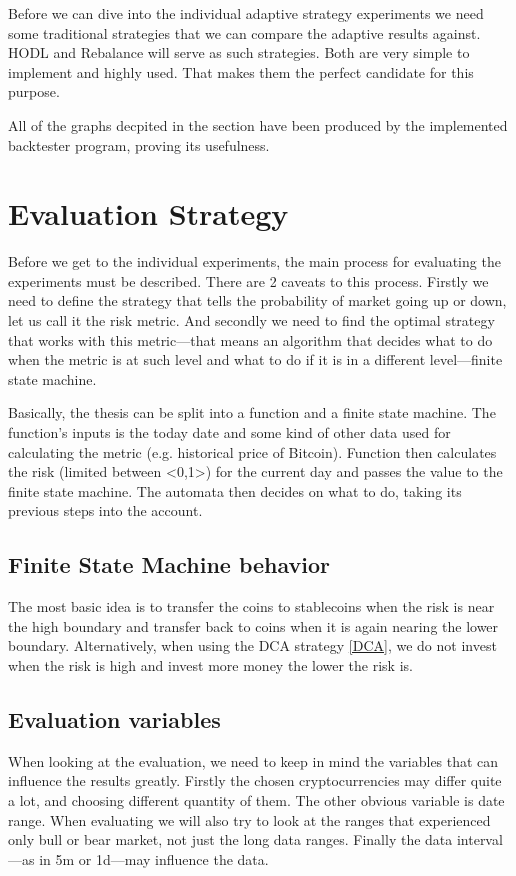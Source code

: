 Before we can dive into the individual adaptive strategy experiments we need some traditional strategies that we can compare the adaptive results against. HODL and Rebalance will serve as such strategies. Both are very simple to implement and highly used. That makes them the perfect candidate for this purpose.

All of the graphs decpited in the section have been produced by the implemented backtester program, proving its usefulness.

\section{Evaluation Strategy}
Before we get to the individual experiments, the main process for evaluating the experiments must be described. There are 2 caveats to this process. Firstly we need to define the strategy that tells the probability of market going up or down, let us call it the risk metric. And secondly we need to find the optimal strategy that works with this metric---that means an algorithm that decides what to do when the metric is at such level and what to do if it is in a different level---finite state machine.

Basically, the thesis can be split into a function and a finite state machine. The function's inputs is the today date and some kind of other data used for calculating the metric (e.g. historical price of Bitcoin). Function then calculates the risk (limited between <0,1>) for the current day and passes the value to the finite state machine. The automata then decides on what to do, taking its previous steps into the account.

\subsection*{Finite State Machine behavior}
The most basic idea is to transfer the coins to stablecoins when the risk is near the high boundary and transfer back to coins when it is again nearing the lower boundary. Alternatively, when using the DCA strategy \ref{DCA}, we do not invest when the risk is high and invest more money the lower the risk is.

\subsection*{Evaluation variables}
When looking at the evaluation, we need to keep in mind the variables that can influence the results greatly. Firstly the chosen cryptocurrencies may differ quite a lot, and choosing different quantity of them. The other obvious variable is date range. When evaluating we will also try to look at the ranges that experienced only bull or bear market, not just the long data ranges. Finally the data interval---as in 5m or 1d---may influence the data.

